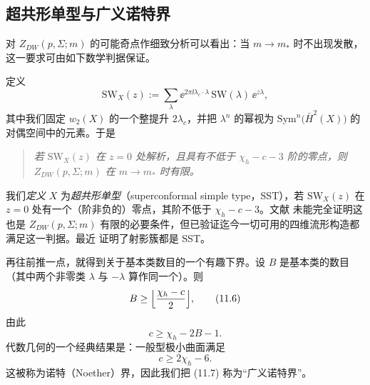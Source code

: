 \subsection{超共形单型与广义诺特界}

对 $Z_{DW}(p,\Sigma;m)$ 的可能奇点作细致分析可以看出：当 $m\to m_{*}$ 时不出现发散，这一要求可由如下数学判据保证。

定义
\begin{equation}
  \mathrm{SW}_{X}(z):=\sum_{\lambda}
  \ee^{2\pi\ii\lambda_{c}\cdot\lambda}\,\mathrm{SW}(\lambda)\,\ee^{z\lambda},
  \tag{11.5}
\end{equation}
其中我们固定 $w_{2}(X)$ 的一个整提升 $2\lambda_{c}$，并把 $\lambda^{n}$ 的幂视为
$\mathrm{Sym}^{n}\bigl(\bar{H}^{2}(X)\bigr)$ 的对偶空间中的元素。于是

\begin{quote}
\itshape 若 $\mathrm{SW}_{X}(z)$ 在 $z=0$ 处解析，且具有不低于 $\chi_{h}-c-3$ 阶的零点，则
$Z_{DW}(p,\Sigma;m)$ 在 $m\to m_{*}$ 时有限。
\end{quote}


我们\emph{定义} $X$ 为\emph{超共形单型}（superconformal simple type，SST），若 $\mathrm{SW}_{X}(z)$ 在 $z=0$ 处有一个（阶非负的）零点，其阶不低于 $\chi_{h}-c-3$。文献 \cite{ref33} 未能完全证明这也是 $Z_{DW}(p,\Sigma;m)$ 有限的必要条件，但已验证迄今一切可用的四维流形构造都满足这一判据。最近 \cite{ref18} 证明了射影簇都是 SST。

再往前推一点，就得到关于基本类数目的一个有趣下界。设 $B$ 是基本类的数目（其中两个非零类 $\lambda$ 与 $-\lambda$ 算作同一个）。则
\begin{equation}
  B\ge\Bigl\lfloor\frac{\chi_{h}-c}{2}\Bigr\rfloor,
  \tag{11.6}
\end{equation}
由此
\begin{equation}
  c\ge\chi_{h}-2B-1.
  \tag{11.7}
\end{equation}
代数几何的一个经典结果是：一般型极小曲面满足
\begin{equation}
  c\ge2\chi_{h}-6.
  \tag{11.8}
\end{equation}
这被称为诺特（Noether）界，因此我们把 (11.7) 称为“广义诺特界”。

